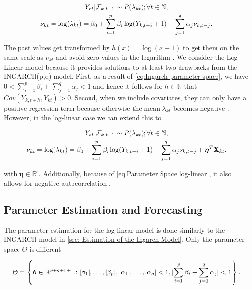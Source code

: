 \begin{gather}
Y_{kt} | \mathcal{F}_{k,t-1} \sim P(\lambda_{kt}); \forall t \in \mathbb{N}, \\
\nu_{kt}= \log(\lambda_{kt}) = \beta_0 + \sum_{i=1}^p\beta_i \log(Y_{k,t-i}+1) + \sum_{j=1}^q\alpha_j \nu_{k,t-j}.
\label{eq:Log-Linear model}
\end{gather}

The past values get transformed by $h(x)=\log(x+1)$ to get them on the same scale as $\nu_{kt}$ and avoid zero values in the logarithm \cite{Liboschik:2016,Fokianos:2011}. We consider the Log-Linear model because it provides solutions to at least two drawbacks from the INGARCH(p,q) model. First, as a result of \ref{eq:Ingarch parameter space}, we have $0 < \sum_{i=1}^p\beta_i + \sum_{j=1}^q\alpha_j < 1$ and hence it follows for $h\in \mathbb{N}$ that $Cov(Y_{k,t+h},Y_{kt})>0$. Second, when we include covariates, they can only have a positive regression term because otherwise the mean $\lambda_{kt}$ becomes negative \cite{Fokianos:2011}. However, in the log-linear case we can extend this to

\begin{gather}
Y_{kt} | \mathcal{F}_{k,t-1} \sim P(\lambda_{kt}); \forall t \in \mathbb{N}, \\
\nu_{kt}= \log(\lambda_{kt}) = \beta_0 + \sum_{i=1}^p\beta_i \log(Y_{k,t-i}+1) + \sum_{j=1}^q\alpha_j \nu_{k,t-j} + \bm{\eta}^T\textbf{X}_{kt}.
\label{eq:Log-Linear model external factors}
\end{gather}

with $\bm{\eta} \in \mathbb{R}^r$. Additionally, because of \ref{eq:Parameter Space log-linear}, it also allows for negative autocorrelation \cite{Liboschik:2016}. 

\subsection{Parameter Estimation and Forecasting}
\label{sec: Log-Linear Parameter Estimation and Forecasting}

The parameter estimation for the log-linear model is done similarly to the INGARCH model in \ref{sec: Estimation of the Ingarch Model}. Only the parameter space $\Theta$ is different

\begin{equation}
\Theta = \left\{ \bm{\theta} \in \mathbb{R}^{p+q+r+1}: \lvert\beta_1\rvert,\ldots,\lvert\beta_p\rvert,\lvert\alpha_1\rvert,\ldots,\lvert\alpha_q\rvert < 1, \lvert\sum_{i=1}^p\beta_i + \sum_{j=1}^q\alpha_j \rvert < 1 \right\}.
\label{eq:Parameter Space log-linear}
\end{equation}

